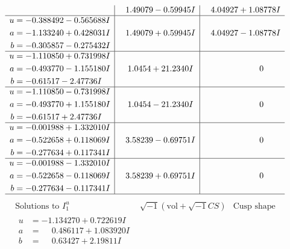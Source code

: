 \documentclass[1p]{elsarticle_modified}
\theoremstyle{definition}
\newcommand{\I}{\sqrt{-1}}
\begin{document}
$$\begin{array}{c|c|c}
 & \phantom{-}1.49079 - 0.59945 I & \phantom{-}4.04927 + 1.08778 I \\ \hline\begin{aligned}
u &= -0.388492 - 0.565688 I \\
a &= -1.133240 + 0.428031 I \\
b &= -0.305857 - 0.275432 I\end{aligned}
 & \phantom{-}1.49079 + 0.59945 I & \phantom{-}4.04927 - 1.08778 I \\ \hline\begin{aligned}
u &= -1.110850 + 0.731998 I \\
a &= -0.493770 - 1.155180 I \\
b &= -0.61517 - 2.47736 I\end{aligned}
 & \phantom{-}1.0454 + 21.2340 I & \phantom{-0.000000 } 0 \\ \hline\begin{aligned}
u &= -1.110850 - 0.731998 I \\
a &= -0.493770 + 1.155180 I \\
b &= -0.61517 + 2.47736 I\end{aligned}
 & \phantom{-}1.0454 - 21.2340 I & \phantom{-0.000000 } 0 \\ \hline\begin{aligned}
u &= -0.001988 + 1.332010 I \\
a &= -0.522658 + 0.118069 I \\
b &= -0.277634 + 0.117341 I\end{aligned}
 & \phantom{-}3.58239 - 0.69751 I & \phantom{-0.000000 } 0 \\ \hline\begin{aligned}
u &= -0.001988 - 1.332010 I \\
a &= -0.522658 - 0.118069 I \\
b &= -0.277634 - 0.117341 I\end{aligned}
 & \phantom{-}3.58239 + 0.69751 I & \phantom{-0.000000 } 0\\
 \hline 
 \end{array}$$\newpage$$\begin{array}{c|c|c}  
\text{Solutions to }I^u_{1}& \I (\text{vol} + \sqrt{-1}CS) & \text{Cusp shape}\\
 \hline 
\begin{aligned}
u &= -1.134270 + 0.722619 I \\
a &= \phantom{-}0.486117 + 1.083920 I \\
b &= \phantom{-}0.63427 + 2.19811 I\end{aligned}

\end{array}$$
\end{document}
